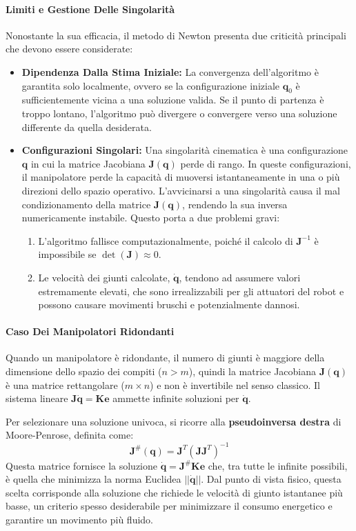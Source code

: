 ﻿\documentclass[11pt, a4paper]{article}
\begin{document}
\paragraph{Limiti e Gestione Delle Singolarità}
Nonostante la sua efficacia, il metodo di Newton presenta due criticità principali che devono essere considerate:
\begin{itemize}
    \item \textbf{Dipendenza Dalla Stima Iniziale:} La convergenza dell'algoritmo è garantita solo localmente, ovvero se la configurazione iniziale \(\bm{q}_0\) è sufficientemente vicina a una soluzione valida. Se il punto di partenza è troppo lontano, l'algoritmo può divergere o convergere verso una soluzione differente da quella desiderata.
    \item \textbf{Configurazioni Singolari:} Una singolarità cinematica è una configurazione \(\bm{q}\) in cui la matrice Jacobiana \(\bm{J}(\bm{q})\) perde di rango. In queste configurazioni, il manipolatore perde la capacità di muoversi istantaneamente in una o più direzioni dello spazio operativo. L'avvicinarsi a una singolarità causa il mal condizionamento della matrice \(\bm{J}(\bm{q})\), rendendo la sua inversa numericamente instabile. Questo porta a due problemi gravi:
    \begin{enumerate}
        \item L'algoritmo fallisce computazionalmente, poiché il calcolo di \(\bm{J}^{-1}\) è impossibile se \(\det(\bm{J}) \approx 0\).
        \item Le velocità dei giunti calcolate, \(\dot{\bm{q}}\), tendono ad assumere valori estremamente elevati, che sono irrealizzabili per gli attuatori del robot e possono causare movimenti bruschi e potenzialmente dannosi.
    \end{enumerate}
\end{itemize}

\paragraph{Caso Dei Manipolatori Ridondanti}
Quando un manipolatore è ridondante, il numero di giunti è maggiore della dimensione dello spazio dei compiti (\(n > m\)), quindi la matrice Jacobiana \(\bm{J}(\bm{q})\) è una matrice rettangolare (\(m \times n\)) e non è invertibile nel senso classico. Il sistema lineare \(\bm{J}\dot{\bm{q}} = \bm{K}\bm{e}\) ammette infinite soluzioni per \(\dot{\bm{q}}\).

Per selezionare una soluzione univoca, si ricorre alla \textbf{pseudoinversa destra} di Moore-Penrose, definita come:
\[
    \bm{J}^{\#}(\bm{q}) = \bm{J}^T (\bm{J} \bm{J}^T)^{-1}
\]
Questa matrice fornisce la soluzione \(\dot{\bm{q}} = \bm{J}^{\#} \bm{K} \bm{e}\) che, tra tutte le infinite possibili, è quella che minimizza la norma Euclidea \(||\dot{\bm{q}}||\). Dal punto di vista fisico, questa scelta corrisponde alla soluzione che richiede le velocità di giunto istantanee più basse, un criterio spesso desiderabile per minimizzare il consumo energetico e garantire un movimento più fluido.
\end{document}
